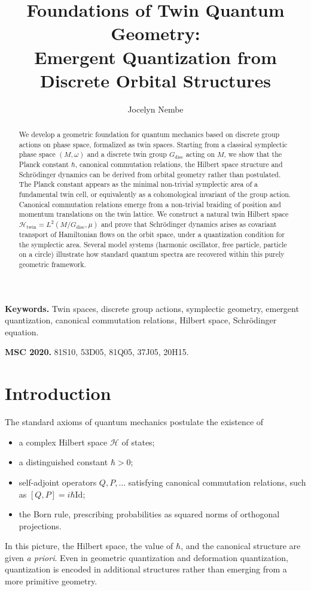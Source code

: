 \documentclass[11pt]{article}
\title{\bf Foundations of Twin Quantum Geometry:\\
	Emergent Quantization from Discrete Orbital Structures}
\author{Jocelyn Nembe}
\date{}
\numberwithin{equation}{section}
\theoremstyle{definition}
\theoremstyle{remark}
\newcommand{\Id}{\mathrm{Id}}
\newcommand{\Hil}{\mathcal{H}}
\newcommand{\Htw}{\mathcal{H}_{\mathrm{twin}}}
\newcommand{\Gdisc}{G_{\mathrm{disc}}}
\begin{document}
	
	\maketitle
	
	\begin{abstract}
		We develop a geometric foundation for quantum mechanics based on discrete
		group actions on phase space, formalized as twin spaces. Starting from a
		classical symplectic phase space $(M,\omega)$ and a discrete twin group
		$\Gdisc$ acting on $M$, we show that the Planck constant $\hbar$,
		canonical commutation relations, the Hilbert space structure and
		Schr\"odinger dynamics can be derived from orbital geometry rather than
		postulated. The Planck constant appears as the minimal non-trivial
		symplectic area of a fundamental twin cell, or equivalently as a
		cohomological invariant of the group action. Canonical commutation
		relations emerge from a non-trivial braiding of position and momentum
		translations on the twin lattice. We construct a natural twin Hilbert
		space $\Htw = L^2(M/\Gdisc,\mu)$ and prove that Schr\"odinger dynamics
		arises as covariant transport of Hamiltonian flows on the orbit space,
		under a quantization condition for the symplectic area. Several model
		systems (harmonic oscillator, free particle, particle on a circle)
		illustrate how standard quantum spectra are recovered within this purely
		geometric framework.
	\end{abstract}
	
	\bigskip
	
	\noindent\textbf{Keywords.}
	Twin spaces, discrete group actions, symplectic geometry,
	emergent quantization, canonical commutation relations,
	Hilbert space, Schr\"odinger equation.
	
	\medskip
	
	\noindent\textbf{MSC 2020.}
	81S10, 53D05, 81Q05, 37J05, 20H15.
	
	\section{Introduction}
	
	The standard axioms of quantum mechanics postulate the existence of
	\begin{itemize}[leftmargin=2em]
		\item a complex Hilbert space $\Hil$ of states;
		\item a distinguished constant $\hbar>0$;
		\item self-adjoint operators $Q,P,\dots$ satisfying canonical
		commutation relations, such as $[Q,P]=i\hbar \Id$;
		\item the Born rule, prescribing probabilities as squared norms of
		orthogonal projections.
	\end{itemize}
	In this picture, the Hilbert space, the value of $\hbar$, and the
	canonical structure are given \emph{a priori}. Even in geometric
	quantization and deformation quantization, quantization is encoded in
	additional structures rather than emerging from a more primitive
	geometry.
	
\end{document}
